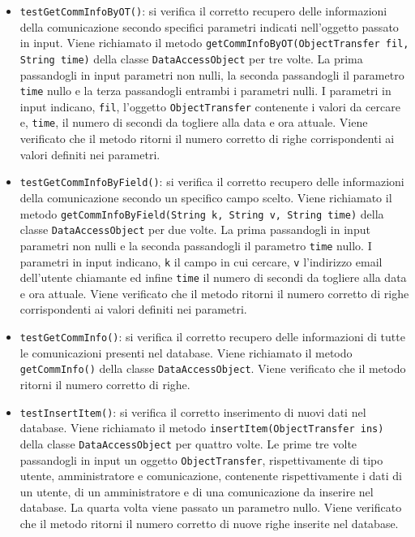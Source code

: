 {{\begin{itemize}
\begin{itemize}
\begin{itemize}
						\item \texttt{testGetCommInfoByOT()}: si verifica il corretto recupero delle informazioni della comunicazione secondo specifici parametri indicati nell'oggetto passato in input. Viene richiamato il metodo \newline \texttt{getCommInfoByOT(ObjectTransfer fil, String time)} della classe \texttt{DataAccessObject} per tre volte. La prima passandogli in input \newline parametri non nulli, la seconda passandogli il parametro \texttt{time} nullo e la terza passandogli entrambi i parametri nulli. I parametri in input indicano, \texttt{fil}, l'oggetto \texttt{ObjectTransfer} contenente i valori da cercare e, \texttt{time}, il numero di secondi da togliere alla data e ora attuale. Viene verificato che il metodo ritorni il numero corretto di righe corrispondenti ai valori definiti nei parametri.
						
						\item \texttt{testGetCommInfoByField()}: si verifica il corretto recupero delle informazioni della comunicazione secondo un specifico campo scelto. Viene richiamato il metodo \newline \texttt{getCommInfoByField(String k, String v, String time)} della \newline classe \texttt{DataAccessObject} per due volte. La prima passandogli in input parametri non nulli e la seconda passandogli il parametro \texttt{time} nullo. I parametri in input indicano, \texttt{k} il campo in cui cercare, \texttt{v} l'indirizzo email dell'utente chiamante ed infine \texttt{time} il numero di secondi da togliere alla data e ora attuale. Viene verificato che il metodo ritorni il numero corretto di righe corrispondenti ai valori definiti nei parametri.
						
						\item \texttt{testGetCommInfo()}: si verifica il corretto recupero delle informazioni di tutte le comunicazioni presenti nel database. Viene richiamato il metodo \texttt{getCommInfo()} della classe \texttt{DataAccessObject}. Viene verificato che il metodo ritorni il numero corretto di righe.
						
						\item \texttt{testInsertItem()}: si verifica il corretto inserimento di nuovi dati nel database. Viene richiamato il metodo \texttt{insertItem(ObjectTransfer ins)} della classe \texttt{DataAccessObject} per quattro volte. Le prime tre volte passandogli in input un oggetto \texttt{ObjectTransfer}, rispettivamente di tipo utente, amministratore e comunicazione, contenente rispettivamente i dati di un utente, di un amministratore e di una comunicazione da inserire nel database. La quarta volta viene passato un parametro nullo. Viene verificato che il metodo ritorni il numero corretto di nuove righe inserite nel database.
						

\end{itemize}
\end{itemize}
\end{itemize}}}
